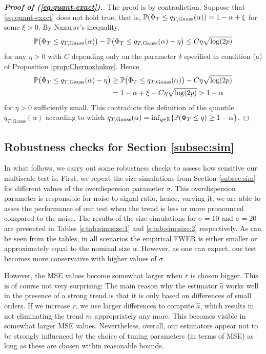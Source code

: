 \documentclass[a4paper,12pt]{article}
\numberwithin{equation}{section}
\begin{document}
\begin{proof}[\textnormal{\textbf{Proof of (\ref{eq:quant-exact}).}}]
The proof is by contradiction. Suppose that \eqref{eq:quant-exact} does not hold true, that is, $\mathbb{P}(\Phi_T \le q_{T,\text{Gauss}}(\alpha)) = 1-\alpha + \xi$ for some $\xi > 0$. By Nazarov's inequality, 
\begin{equation*}
\mathbb{P} \big(\Phi_T \le q_{T,\text{Gauss}}(\alpha)\big) - \mathbb{P}\big(\Phi_T \le q_{T,\text{Gauss}}(\alpha) - \eta\big) \le C \eta \sqrt{\log (2p)} 
\end{equation*}
for any $\eta > 0$ with $C$ depending only on the parameter $\delta$ specified in condition (a) of Proposition \ref{prop:Chernozhukov}. Hence, 
\begin{align*}
\mathbb{P} \big(\Phi_T \le q_{T,\text{Gauss}}(\alpha) - \eta\big) 
 & \ge \mathbb{P}\big(\Phi_T \le q_{T,\text{Gauss}}(\alpha) \big) - C \eta \sqrt{\log(2p)} \\
 & = 1-\alpha + \xi - C \eta \sqrt{\log(2p)} > 1-\alpha
\end{align*}
for $\eta > 0$ sufficiently small. This contradicts the definition of the quantile $q_{T,\text{Gauss}}(\alpha)$ according to which $q_{T,\text{Gauss}}(\alpha) = \inf_{q \in \mathbb{R}} \{ \mathbb{P}(\Phi_T \le q) \ge 1-\alpha \}$. 
\end{proof}

\newpage
\subsection{Robustness checks for Section \ref{subsec:sim}}\label{s:subsec:robustness}
In what follows, we carry out some robustness checks to assess how sensitive our multiscale test is. First, we repeat the size simulations from Section \ref{subsec:sim} for different values of the overdispersion parameter $\sigma$. This overdispersion parameter is responsible for noise-to-signal ratio, hence, varying it, we are able to asses the performance of our test when the trend is less or more pronounced compared to the noise. The results of the size simulations for $\sigma = 10$ and $\sigma = 20$ are presented in Tables \ref{s:tab:sim:size:1} and \ref{s:tab:sim:size:2} respectively. As can be seen from the tables, in all scenarios the empirical FWER is either smaller or approximately equal to the nominal size $\alpha$. However, as one can expect, our test becomes more conservative with higher values of $\sigma$. 



However, the MSE values become somewhat larger when $\overline{r}$ is chosen bigger. This is of course not very surprising: The main reason why the estimator $\widehat{a}$ works well in the presence of a strong trend is that it is only based on differences of small orders. If we increase $\overline{r}$, we use larger differences to compute $\widehat{a}$, which results in not eliminating the trend $m$ appropriately any more. This becomes visible in somewhat larger MSE values. Nevertheless, overall, our estimators appear not to be strongly influenced by the choice of tuning parameters (in terms of MSE) as long as these are chosen within reasonable bounds. 
\end{document}
